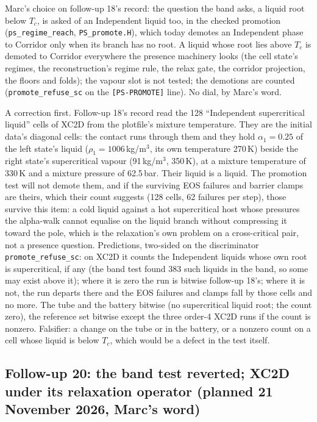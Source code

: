 \documentclass[11pt,a4paper]{article}
\newcommand{\code}[1]{\texttt{\small #1}}
\begin{document}
Marc's choice on follow-up 18's record: the question the band asks,
a liquid root below $T_c$, is asked of an Independent liquid too, in
the checked promotion (\code{ps\_regime\_reach}, \code{PS\_promote.H}),
which today demotes an Independent phase to Corridor only when its
branch has no root.  A liquid whose root lies above $T_c$ is demoted to
Corridor everywhere the presence machinery looks (the cell state's
regimes, the reconstruction's regime rule, the relax gate, the corridor
projection, the floors and folds); the vapour slot is not tested; the
demotions are counted (\code{promote\_refuse\_sc} on the
\code{[PS-PROMOTE]} line).  No dial, by Marc's word.

A correction first.  Follow-up 18's record read the 128 ``Independent
supercritical liquid'' cells of XC2D from the plotfile's mixture
temperature.  They are the initial data's diagonal cells: the contact
runs through them and they hold $\alpha_1 = 0.25$ of the left state's
liquid ($\rho_1 = 1006$\,kg/m$^3$, its own temperature 270\,K) beside
the right state's supercritical vapour (91\,kg/m$^3$, 350\,K), at a
mixture temperature of 330\,K and a mixture pressure of 62.5\,bar.
Their liquid is a liquid.  The promotion test will not demote them, and
if the surviving EOS failures and barrier clamps are theirs, which their
count suggests (128 cells, 62 failures per step), those survive this
item: a cold liquid against a hot supercritical host whose pressures the
alpha-walk cannot equalise on the liquid branch without compressing it
toward the pole, which is the relaxation's own problem on a
cross-critical pair, not a presence question.  Predictions, two-sided
on the discriminator \code{promote\_refuse\_sc}: on XC2D it counts the
Independent liquids whose own root is supercritical, if any (the band
test found 383 such liquids in the band, so some may exist above it);
where it is zero the run is bitwise follow-up 18's; where it is not,
the run departs there and the EOS failures and clamps fall by those
cells and no more.  The tube and the battery bitwise (no supercritical
liquid root; the count zero), the reference set bitwise except the
three order-4 XC2D runs if the count is nonzero.  Falsifier: a change
on the tube or in the battery, or a nonzero count on a cell whose
liquid is below $T_c$, which would be a defect in the test itself.

\subsection*{Follow-up 20: the band test reverted; XC2D under its relaxation operator (planned 21 November 2026, Marc's word)}
\end{document}
